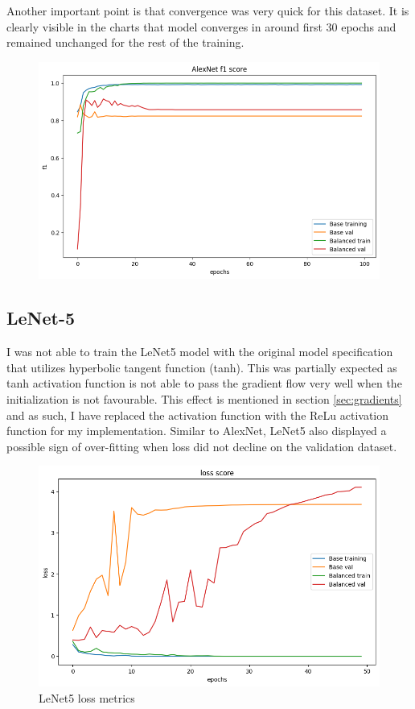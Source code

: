 Another important point is that convergence was very quick for this dataset. 
It is clearly visible in the charts that model converges in around first 30 epochs and remained unchanged for the rest of the training.

\begin{figure}[H]
    \centering
    \includegraphics[width=.9\textwidth]{img/alexnetf1.png}
    \caption{}
    \label{fig:alexf1}
\end{figure}


\subsection{LeNet-5}
I was not able to train the LeNet5 model with the original model specification that utilizes hyperbolic tangent function (tanh).
This was partially expected as tanh activation function is not able to pass the gradient flow very well when the initialization is not favourable.
This effect is mentioned in section \ref{sec:gradients} and as such, I have replaced the activation function with the ReLu activation function for my implementation.
Similar to AlexNet, LeNet5 also displayed a possible sign of over-fitting when loss did not decline on the validation dataset.

\begin{figure}[H]
    \centering
    \includegraphics[width=.8\textwidth]{img/lenetloss.png}
    \caption{LeNet5 loss metrics}
    \label{fig:lenetloss}
\end{figure}

